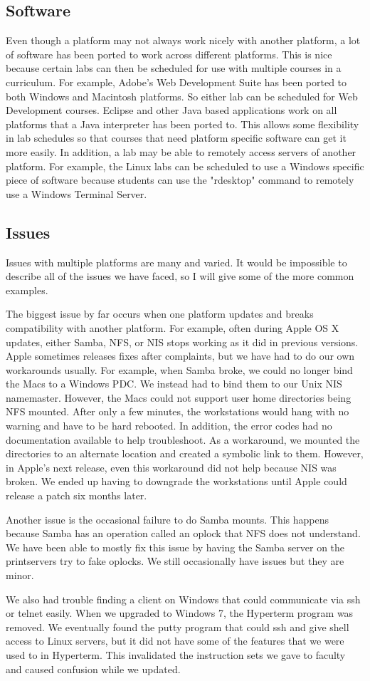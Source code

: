 \subsection{Software}
Even though a platform may not always work nicely with another platform, a lot of software has been ported to work across different platforms.  This is nice because certain labs can then be scheduled for use with multiple courses in a curriculum.  For example, Adobe's Web Development Suite has been ported to both Windows and Macintosh platforms.  So either lab can be scheduled for Web Development courses.  Eclipse and other Java based applications work on all platforms that a Java interpreter has been ported to.  This allows some flexibility in lab schedules so that courses that need platform specific software can get it more easily.  In addition, a lab may be able to remotely access servers of another platform.  For example, the Linux labs can be scheduled to use a Windows specific piece of software because students can use the "rdesktop" command to remotely use a Windows Terminal Server.  

\subsection{Issues}
Issues with multiple platforms are many and varied.  It would be impossible to describe all of the issues we have faced, so I will give some of the more common examples.  

The biggest issue by far occurs when one platform updates and breaks compatibility with another platform.  For example, often during Apple OS X updates, either Samba, NFS, or NIS stops working as it did in previous versions.  Apple sometimes releases fixes after complaints, but we have had to do our own workarounds usually.  For example, when Samba broke, we could no longer bind the Macs to a Windows PDC.  We instead had to bind them to our Unix NIS namemaster.  However, the Macs could not support user home directories being NFS mounted.  After only a few minutes, the workstations would hang with no warning and have to be hard rebooted.  In addition, the error codes had no documentation available to help troubleshoot.  As a workaround, we mounted the directories to an alternate location and created a symbolic link to them.  However, in Apple's next release, even this workaround did not help because NIS was broken.  We ended up having to downgrade the workstations until Apple could release a patch six months later.

Another issue is the occasional failure to do Samba mounts.  This happens because Samba has an operation called an oplock that NFS does not understand.  We have been able to mostly fix this issue by having the Samba server on the printservers try to fake oplocks.  We still occasionally have issues but they are minor.  

We also had trouble finding a client on Windows that could communicate via ssh or telnet easily.  When we upgraded to Windows 7, the Hyperterm program was removed.  We eventually found the putty program that could ssh and give shell access to Linux servers, but it did not have some of the features that we were used to in Hyperterm.  This invalidated the instruction sets we gave to faculty and caused confusion while we updated.  
